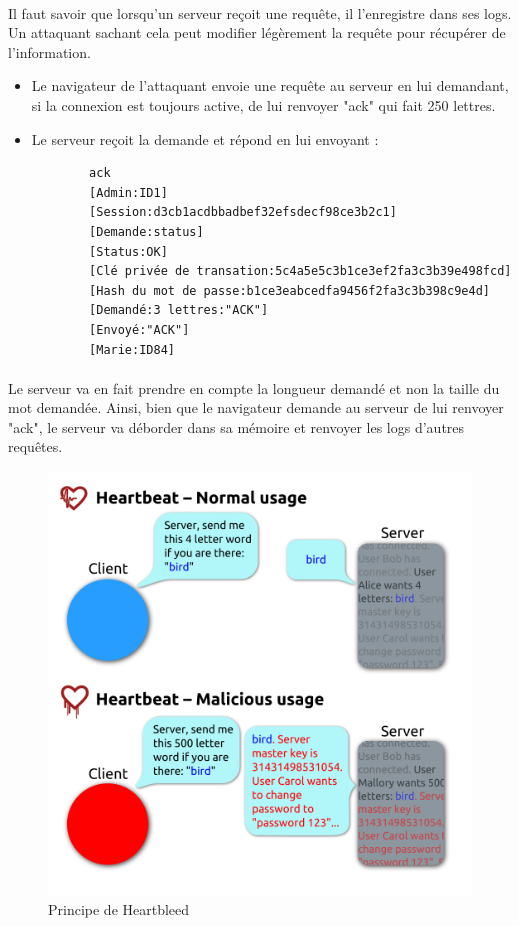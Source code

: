 \paragraph{}
Il faut savoir que lorsqu'un serveur reçoit une requête, il l'enregistre dans ses logs. Un attaquant sachant cela peut modifier légèrement la requête pour récupérer de l'information.
\begin{itemize}
  \item Le navigateur de l'attaquant envoie une requête au serveur en lui demandant, si la connexion est toujours active, de lui renvoyer "ack" qui fait 250 lettres.
  \item Le serveur reçoit la demande et répond en lui envoyant :
	\begin{verbatim}
		ack
		[Admin:ID1]
		[Session:d3cb1acdbbadbef32efsdecf98ce3b2c1]
		[Demande:status]
		[Status:OK]
		[Clé privée de transation:5c4a5e5c3b1ce3ef2fa3c3b39e498fcd]
		[Hash du mot de passe:b1ce3eabcedfa9456f2fa3c3b398c9e4d]
		[Demandé:3 lettres:"ACK"]
		[Envoyé:"ACK"]
		[Marie:ID84]
	\end{verbatim}
\end{itemize}

\paragraph{}
Le serveur va en fait prendre en compte la longueur demandé et non la taille du mot demandée. Ainsi, bien que le navigateur demande au serveur de lui renvoyer "ack", le serveur va déborder dans sa mémoire et renvoyer les logs d'autres requêtes.\\

\begin{figure}[h]
\label{fig:Heartbleed}
\centering
\includegraphics[scale=0.2]{Heartbleed}
\caption{Principe de Heartbleed}
\end{figure}

